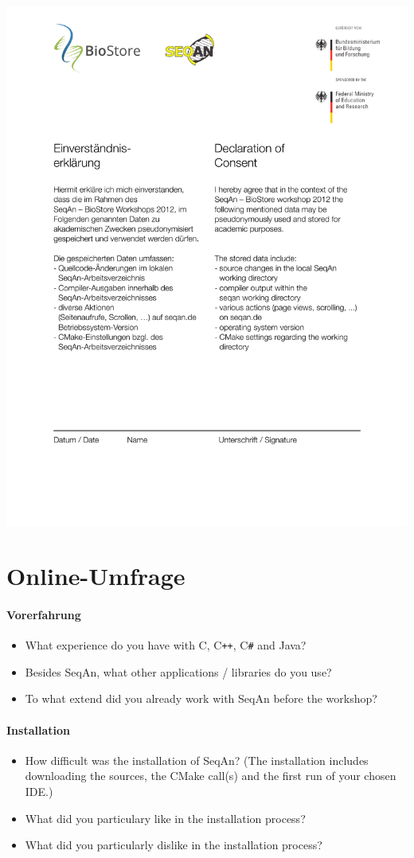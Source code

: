 \begin{center}
  \includegraphics[width=0.85\linewidth]{Figures/declaration-of-consent.pdf}
\end{center}




\section{Online-Umfrage}
\label{app:umfrage}

\paragraph{Vorerfahrung}
\begin{itemize}
  \item What experience do you have with C, C{}\verb!++!, C{}\verb!#! and Java?
  \item Besides SeqAn, what other applications / libraries do you use?
  \item To what extend did you already work with SeqAn before the workshop?
\end{itemize}

\paragraph{Installation}
\begin{itemize}
  \item How difficult was the installation of SeqAn? (The installation includes downloading the sources, the CMake call(s) and the first run of your chosen IDE.)
  \item What did you particulary like in the installation process?
  \item What did you particularly dislike in the installation process?
\end{itemize}

